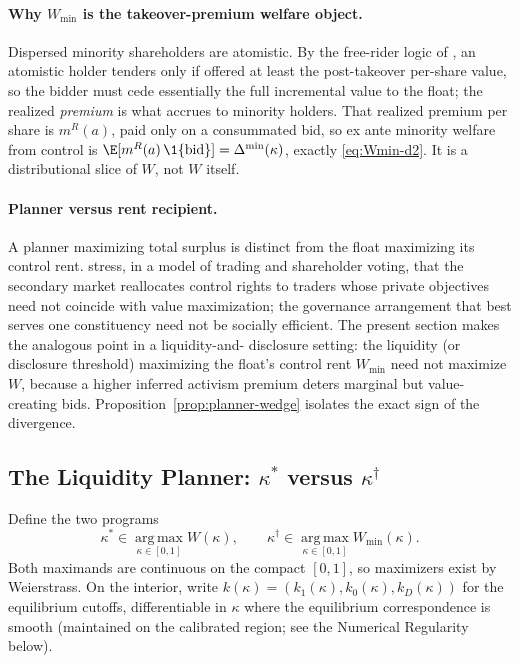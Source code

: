 \paragraph{Why $W_{\min}$ is the takeover-premium welfare object.}
Dispersed minority shareholders are atomistic. By the free-rider logic of
\citet{GrossmanHart1980}, an atomistic holder tenders only if offered at least
the post-takeover per-share value, so the bidder must cede essentially the full
incremental value to the float; the realized \emph{premium} is what accrues to
minority holders. That realized premium per share is $m^{R}(a)$, paid only on a
consummated bid, so ex ante minority welfare from control is
$\E[m^{R}(a)\,\1\{\textup{bid}\}]=\Delta^{\min}(\kappa)$, exactly
\eqref{eq:Wmin-d2}. It is a distributional slice of $W$, not $W$ itself.

\paragraph{Planner versus rent recipient.}
A planner maximizing total surplus is distinct from the float maximizing its
control rent. \citet{LevitMalenkoMaug2024} stress, in a model of trading and
shareholder voting, that the secondary market reallocates control rights to
traders whose private objectives need not coincide with value maximization; the
governance arrangement that best serves one constituency need not be socially
efficient. The present section makes the analogous point in a liquidity-and-%
disclosure setting: the liquidity (or disclosure threshold) maximizing the
float's control rent $W_{\min}$ need not maximize $W$, because a higher inferred
activism premium deters marginal but value-creating bids.
Proposition~\ref{prop:planner-wedge} isolates the exact sign of the divergence.

%
\subsection{The Liquidity Planner: $\kappa^{\ast}$ versus $\kappa^{\dagger}$}
\label{sec:welf-kappa}
%

Define the two programs
\begin{equation}
\kappa^{\ast}\in\operatorname*{arg\,max}_{\kappa\in[0,1]}W(\kappa),\qquad
\kappa^{\dagger}\in\operatorname*{arg\,max}_{\kappa\in[0,1]}W_{\min}(\kappa).
\label{eq:two-programs}
\end{equation}
Both maximands are continuous on the compact $[0,1]$, so maximizers exist by
Weierstrass. On the interior, write $k(\kappa)=(k_1(\kappa),k_0(\kappa),
k_D(\kappa))$ for the equilibrium cutoffs, differentiable in $\kappa$ where the
equilibrium correspondence is smooth (maintained on the calibrated region; see
the Numerical Regularity below).

